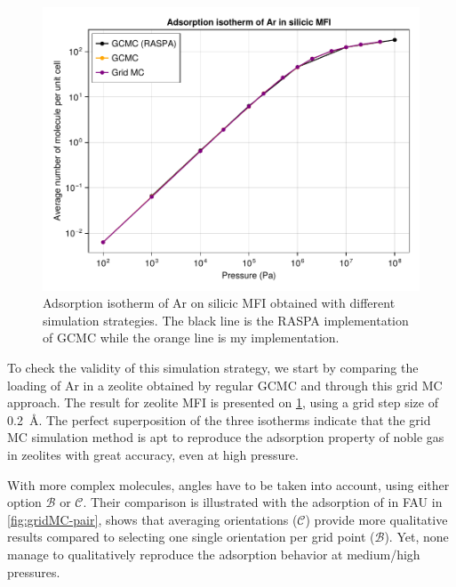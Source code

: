 \documentclass[main.tex]{subfiles}
\begin{document}
\begin{figure}
	\centering
	\includegraphics[width=0.8\columnwidth]{figures/gcmc/gridmc_Ar_MFI.pdf}
	\caption{Adsorption isotherm of Ar on silicic MFI obtained with different simulation strategies. The black line is the RASPA implementation of GCMC while the orange line is my implementation.}\label{fig:gridMC-ArMFI}
\end{figure}

To check the validity of this simulation strategy, we start by comparing the loading of Ar in a zeolite obtained by regular GCMC and through this grid MC approach. The result for zeolite MFI is presented on \cref{fig:gridMC-ArMFI}, using a grid step size of \qty{0.2}{\angstrom}. The perfect superposition of the three isotherms indicate that the grid MC simulation method is apt to reproduce the adsorption property of noble gas in zeolites with great accuracy, even at high pressure.

With more complex molecules, angles have to be taken into account, using either option $\mathscr B$ or $\mathscr C$. Their comparison is illustrated with the adsorption of  in FAU in \cref{fig:gridMC-pair}, shows that averaging orientations ($\mathscr C$) provide more qualitative results compared to selecting one single orientation per grid point ($\mathscr B$). Yet, none manage to qualitatively reproduce the adsorption behavior at medium/high pressures.
\end{document}
